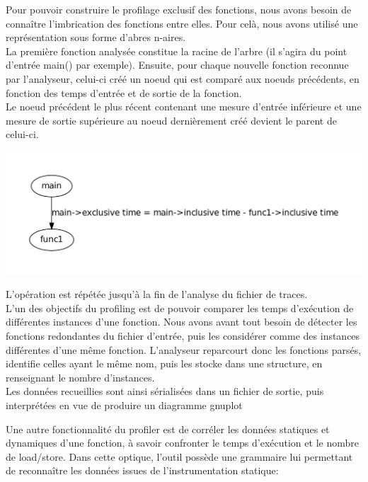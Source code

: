 \documentclass[oneside,11pt]{article}
\begin{document}
Pour pouvoir construire le profilage exclusif des fonctions, nous avons besoin de connaître l'imbrication des fonctions entre elles.
Pour celà, nous avons utilisé une représentation sous forme d'abres n-aires.\\
La première fonction analysée constitue la racine de l'arbre (il s'agira du point d'entrée main() par exemple). Ensuite, pour chaque nouvelle fonction reconnue par l'analyseur, celui-ci créé un noeud qui est comparé aux noeuds précédents, en fonction des temps d'entrée et de sortie de la fonction.\\
Le noeud précédent le plus récent contenant une mesure d'entrée inférieure et une mesure de sortie supérieure au noeud dernièrement créé devient le parent de celui-ci.\\

\begin{center}
	\includegraphics[scale=0.50]{Tree1}
\end{center}

L'opération est répétée jusqu'à la fin de l'analyse du fichier de traces.\\


L'un des objectifs du profiling est de pouvoir comparer les temps d'exécution de différentes instances d'une fonction. Nous avons avant tout besoin de détecter les fonctions redondantes du fichier d'entrée, puis les considérer comme des instances différentes d'une même fonction.
L'analyseur reparcourt donc les fonctions parsés, identifie celles ayant le même nom, puis les stocke dans une structure, en renseignant le nombre d'instances.\\
Les données recueillies sont ainsi sérialisées dans un fichier de sortie, puis interprétées en vue de produire un diagramme gnuplot 


Une autre fonctionnalité du profiler est de corréler les données statiques et dynamiques d'une fonction, à savoir confronter le temps d'exécution et le nombre de load/store. Dans cette optique, l'outil possède une grammaire lui permettant de reconnaître les données issues de l'instrumentation statique:
\end{document}
